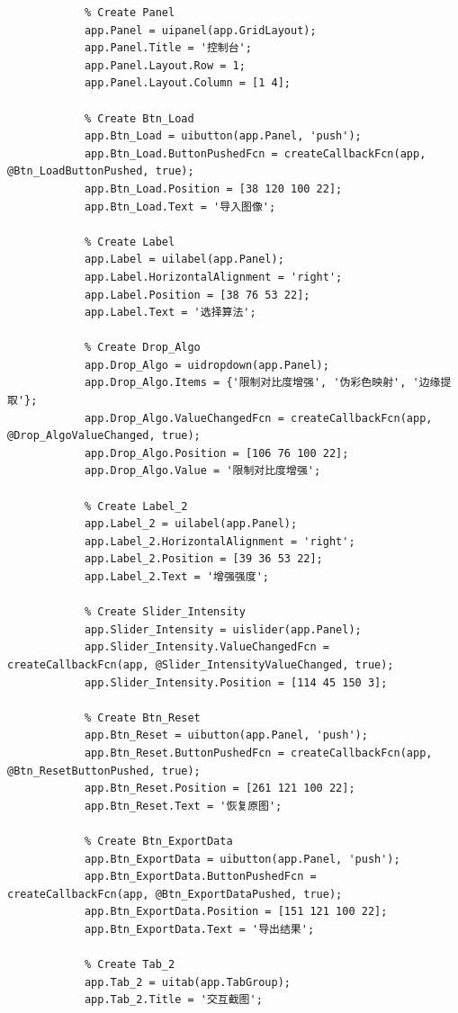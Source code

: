 \documentclass[UTF8, a4paper, 11pt]{ctexart}
\begin{document}
\begin{lstlisting}
            % Create Panel
            app.Panel = uipanel(app.GridLayout);
            app.Panel.Title = '控制台';
            app.Panel.Layout.Row = 1;
            app.Panel.Layout.Column = [1 4];

            % Create Btn_Load
            app.Btn_Load = uibutton(app.Panel, 'push');
            app.Btn_Load.ButtonPushedFcn = createCallbackFcn(app, @Btn_LoadButtonPushed, true);
            app.Btn_Load.Position = [38 120 100 22];
            app.Btn_Load.Text = '导入图像';

            % Create Label
            app.Label = uilabel(app.Panel);
            app.Label.HorizontalAlignment = 'right';
            app.Label.Position = [38 76 53 22];
            app.Label.Text = '选择算法';

            % Create Drop_Algo
            app.Drop_Algo = uidropdown(app.Panel);
            app.Drop_Algo.Items = {'限制对比度增强', '伪彩色映射', '边缘提取'};
            app.Drop_Algo.ValueChangedFcn = createCallbackFcn(app, @Drop_AlgoValueChanged, true);
            app.Drop_Algo.Position = [106 76 100 22];
            app.Drop_Algo.Value = '限制对比度增强';

            % Create Label_2
            app.Label_2 = uilabel(app.Panel);
            app.Label_2.HorizontalAlignment = 'right';
            app.Label_2.Position = [39 36 53 22];
            app.Label_2.Text = '增强强度';

            % Create Slider_Intensity
            app.Slider_Intensity = uislider(app.Panel);
            app.Slider_Intensity.ValueChangedFcn = createCallbackFcn(app, @Slider_IntensityValueChanged, true);
            app.Slider_Intensity.Position = [114 45 150 3];

            % Create Btn_Reset
            app.Btn_Reset = uibutton(app.Panel, 'push');
            app.Btn_Reset.ButtonPushedFcn = createCallbackFcn(app, @Btn_ResetButtonPushed, true);
            app.Btn_Reset.Position = [261 121 100 22];
            app.Btn_Reset.Text = '恢复原图';

            % Create Btn_ExportData
            app.Btn_ExportData = uibutton(app.Panel, 'push');
            app.Btn_ExportData.ButtonPushedFcn = createCallbackFcn(app, @Btn_ExportDataPushed, true);
            app.Btn_ExportData.Position = [151 121 100 22];
            app.Btn_ExportData.Text = '导出结果';

            % Create Tab_2
            app.Tab_2 = uitab(app.TabGroup);
            app.Tab_2.Title = '交互截图';


\end{lstlisting}
\end{document}
